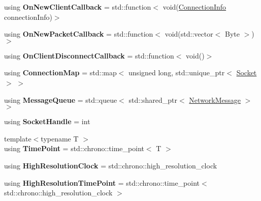 \begin{DoxyCompactItemize}
\item 
\mbox{\label{namespace_blade_afb7916a663fbc9908082ea867a114953}} 
using {\bfseries On\+New\+Client\+Callback} = std\+::function$<$ void(\hyperlink{struct_blade_1_1_connection_info}{Connection\+Info} connection\+Info)$>$
\item 
\mbox{\label{namespace_blade_a0470c5784f08aeafb3ff497f2747ad0c}} 
using {\bfseries On\+New\+Packet\+Callback} = std\+::function$<$ void(std\+::vector$<$ Byte $>$)$>$
\item 
\mbox{\label{namespace_blade_a548bd01cd3e9b14390395e59bee2e34b}} 
using {\bfseries On\+Client\+Disconnect\+Callback} = std\+::function$<$ void()$>$
\item 
\mbox{\label{namespace_blade_abe56b97d52c0705a442669daee7353d6}} 
using {\bfseries Connection\+Map} = std\+::map$<$ unsigned long, std\+::unique\+\_\+ptr$<$ \hyperlink{class_blade_1_1_socket}{Socket} $>$ $>$
\item 
\mbox{\label{namespace_blade_acfd28a8233ab1f0f7b34c7f6222392a4}} 
using {\bfseries Message\+Queue} = std\+::queue$<$ std\+::shared\+\_\+ptr$<$ \hyperlink{class_blade_1_1_network_message}{Network\+Message} $>$ $>$
\item 
\mbox{\label{namespace_blade_a37a94f5c0e7db007cfc9ab7b5550d6c6}} 
using {\bfseries Socket\+Handle} = int
\item 
\mbox{\label{namespace_blade_ae03a971a4b0432441e6c2d11e4986d1d}} 
{\footnotesize template$<$typename T $>$ }\\using {\bfseries Time\+Point} = std\+::chrono\+::time\+\_\+point$<$ T $>$
\item 
\mbox{\label{namespace_blade_a0c70d4dd4108051ef969a8e4fa46e1db}} 
using {\bfseries High\+Resolution\+Clock} = std\+::chrono\+::high\+\_\+resolution\+\_\+clock
\item 
\mbox{\label{namespace_blade_af8da9661ca40c08303471eedaabd3ab3}} 
using {\bfseries High\+Resolution\+Time\+Point} = std\+::chrono\+::time\+\_\+point$<$ std\+::chrono\+::high\+\_\+resolution\+\_\+clock $>$

\end{DoxyCompactItemize}
